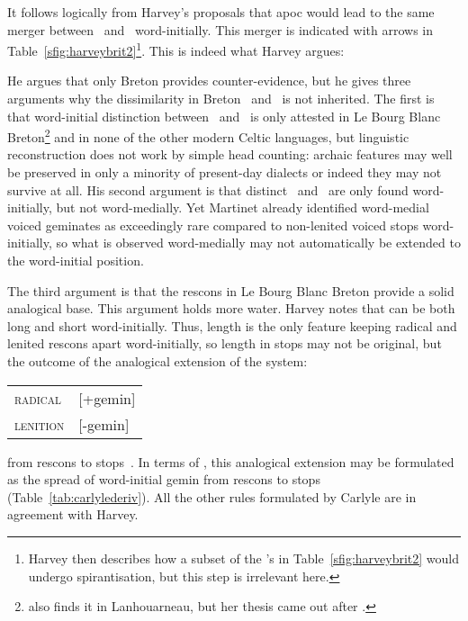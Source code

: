 It follows logically from Harvey's proposals that \gls{apoc} would lead to the same merger between \lT\ and \xD\ word-initially. This merger is indicated with arrows in Table~\ref{sfig:harveybrit2}\footnote{Harvey then describes how a subset of the 's in Table~\ref{sfig:harveybrit2} would  undergo spirantisation, but this step is irrelevant here.}. This is indeed what Harvey argues:

He argues that only Breton provides counter-evidence, but he gives three arguments why the dissimilarity in Breton \lT\ and \xD\ is not inherited. The first is that word-initial distinction between \lT\ and \xD\ is only attested in Le Bourg Blanc Breton\footnote{\Textcite{carlyle_syllabic_1988} also finds it in Lanhouarneau, but her thesis came out after \textcite{harvey_aspects_1984}.} and in none of the other modern Celtic languages, but linguistic reconstruction does not work by simple head counting: archaic features may well be preserved in only a minority of present-day dialects or indeed they may not survive at all. His second argument is that distinct \lT\ and \xD\ are only found word-initially, but not word-medially. Yet Martinet already identified word-medial voiced geminates as exceedingly rare compared to non-lenited voiced stops word-initially, so what is observed word-medially may not automatically be extended to the word-initial position.

The third argument is that the \gls{rescon}s in Le Bourg Blanc Breton provide a solid analogical base. This argument holds more water. Harvey notes that  can be both long and short word-initially. Thus, length is the only feature keeping radical and lenited \gls{rescon}s apart word-initially, so length in stops may not be original, but the outcome of the analogical extension of the system:
\begin{center}
  \begin{tabular}{l@{~=~}l}
    \textsc{radical}  & [+\gls{gemin}]\\
    \textsc{lenition} & [-\gls{gemin}]
  \end{tabular}
\end{center}
from \gls{rescon}s to stops~\autocite{harvey_aspects_1984}. In terms of  \textcite{carlyle_syllabic_1988}, this analogical extension may be formulated as the spread of word-initial \gls{gemin} from \gls{rescon}s to stops (Table~\ref{tab:carlylederiv}). All the other rules formulated by Carlyle are in agreement with Harvey.


